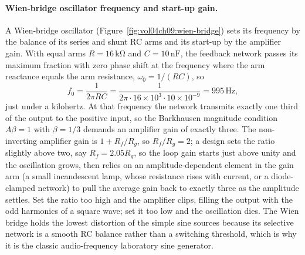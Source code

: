 \paragraph{Wien-bridge oscillator frequency and start-up gain.}
A Wien-bridge oscillator (Figure~\ref{fig:vol04ch09:wien-bridge}) sets its
frequency by the balance of its series and shunt RC arms and its start-up by the
amplifier gain. With equal arms $R = 16\,\si{\kilo\ohm}$ and $C = 10\,\si{\nano
\farad}$, the feedback network passes its maximum fraction with zero phase shift
at the frequency where the arm reactance equals the arm resistance, $\omega_0 =
1/(RC)$, so
\[
f_0 = \frac{1}{2\pi RC}
= \frac{1}{2\pi\cdot 16\times 10^{3}\cdot 10\times 10^{-9}}
= 995\,\si{\hertz},
\]
just under a kilohertz. At that frequency the network transmits exactly one
third of the output to the positive input, so the Barkhausen magnitude condition
$A\beta = 1$ with $\beta = 1/3$ demands an amplifier gain of exactly three. The
non-inverting amplifier gain is $1 + R_f/R_g$, so $R_f/R_g = 2$; a design sets
the ratio slightly above two, say $R_f = 2.05R_g$, so the loop gain starts just
above unity and the oscillation grows, then relies on an amplitude-dependent
element in the gain arm (a small incandescent lamp, whose resistance rises with
current, or a diode-clamped network) to pull the average gain back to exactly
three as the amplitude settles. Set the ratio too high and the amplifier clips,
filling the output with the odd harmonics of a square wave; set it too low and
the oscillation dies. The Wien bridge holds the lowest distortion of the simple
sine sources because its selective network is a smooth RC balance rather than a
switching threshold, which is why it is the classic audio-frequency laboratory
sine generator.

